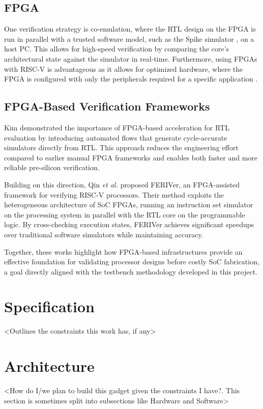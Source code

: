 \documentclass[10pt,twocolumn]{article}
\begin{document}
\subsection{FPGA}
One verification strategy is co-emulation, where the RTL design on the FPGA is run in parallel with a trusted software model, such as the Spike simulator \cite{moreno2023fpga}, on a host PC. This allows for high-speed verification by comparing the core's architectural state against the simulator in real-time. Furthermore, using FPGAs with RISC-V is advantageous as it allows for optimized hardware, where the FPGA is configured with only the peripherals required for a specific application \cite{efinix2023riscv}.

\subsection{FPGA-Based Verification Frameworks}

Kim \cite{kim2019fpga} demonstrated the importance of FPGA-based acceleration for RTL evaluation by introducing automated flows that generate cycle-accurate simulators directly from RTL. This approach reduces the engineering effort compared to earlier manual FPGA frameworks and enables both faster and more reliable pre-silicon verification. 

Building on this direction, Qin \textit{et al.} \cite{qin2025feriver} proposed FERIVer, an FPGA-assisted framework for verifying RISC-V processors. Their method exploits the heterogeneous architecture of SoC FPGAs, running an instruction set simulator on the processing system in parallel with the RTL core on the programmable logic. By cross-checking execution states, FERIVer achieves significant speedups over traditional software simulators while maintaining accuracy. 

Together, these works highlight how FPGA-based infrastructures provide an effective foundation for validating processor designs before costly SoC fabrication, a goal directly aligned with the testbench methodology developed in this project.


\section{Specification}
<Outlines the constraints this work has, if any>\\

\section{Architecture}
<How do I/we plan to build this gadget given the constraints I have?. This section is sometimes split into subsections like Hardware and Software>
\end{document}
